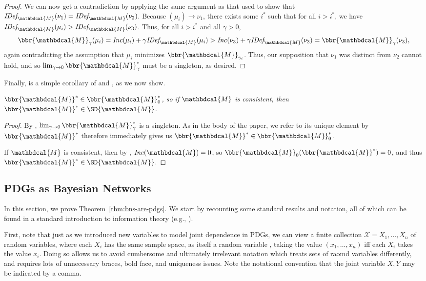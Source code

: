 \documentclass[letterpaper]{article} %
\makeatletter
\theoremstyle{plain}
\theoremstyle{definition}
\theoremstyle{remark}
\newcommand{\restate}[2]
	{\medskip\par\noindent{\bf \expandarg\Cref{thmt@@#1}.}%
 	\noindent\begingroup\em #2 \endgroup\par\smallskip}
\newcommand{\dg}[1]{\mathbdcal{#1}}
\newcommand{\IDef}[1]{\mathit{IDef}_{\!#1}}
\newcommand\Inc{\mathit{Inc}}
\makeatother
\begin{document}
\begin{proof}
We can now get a contradiction by applying the same argument as that used to show
that $\IDef{\dg M}(\nu_1) =\IDef{\dg M}(\nu_2)$.  
    Because $(\mu_{i}) \to \nu_1$, there exists some
    $i^*$ such that for all $i > i^*$, we have $\IDef{\dg M}(\mu_{i}) >
    \IDef{\dg M}(\nu_3)$. Thus, for all $i > i^*$ and all
    $\gamma > 0$, 
    \[ \bbr{\dg M}_\gamma(\mu_{i}) = \Inc(\mu_{i}) + \gamma\IDef{\dg M}(\mu_{i}) > \Inc(\nu_3) 
    + \gamma \IDef{\dg M}(\nu_3) = \bbr{\dg M}_\gamma(\nu_3),\]
again contradicting the assumption that $\mu_{i}$ minimizes
$\bbr{\dg M}_{\gamma_{i}}$.
Thus, our supposition that $\nu_1$ was distinct from $\nu_2$ cannot hold, and so
$\lim_{\gamma \to 0}\bbr{\dg M}_\gamma^*$ must be a singleton, as desired.
\end{proof}

Finally,  is a simple corollary of  and , as we now show. 
\restate{prop:consist}{
$\bbr{\dg M}^* \in \bbr{\dg M}_0^*$, so if $\dg M$ is consistent,
then $\bbr{\dg M}^* \in \SD{\dg  M}$.
}

\begin{proof}
By , $\lim_{\gamma \to 0}\bbr{\dg M}_\gamma^*$
is a singleton. As in the body of the paper, we refer to its unique element by $\bbr{\dg M}^*$
 therefore immediately gives us $\bbr{\dg M}^* \in \bbr{\dg M}_0^*$.  

If $\dg M$ is consistent, then by ,
$\Inc({\dg M}) = 0$, so $\bbr{\dg M}_0(\bbr{\dg M}^*) = 0$, and thus
$\bbr{\dg M}^* 
\in \SD{\dg M}$. 
\end{proof}


	\subsection{PDGs as Bayesian Networks}
In this section, we prove Theorem~\ref{thm:bns-are-pdgs}.  
We start by recounting some standard results and notation, all of
which can be found in a standard introduction to information
theory (e.g., \cite[Chapter 1]{mackay2003information}).  

First, note that just as we introduced new variables to model joint dependence
in PDGs, we can view a finite collection $\mathcal X=X_1, \ldots, X_n$ of random
variables, where each $X_i$ has the same sample space, as itself a random
variable%
, taking the value $(x_1, \ldots, x_n)$ iff each $X_i$ takes the value $x_i$.
Doing so allows us to avoid cumbersome and ultimately irrelevant notation which treats sets of raomd variables differently, and requires lots of unnecessary braces, bold face, and uniqueness issues. 
Note the notational convention that the joint variable $X,Y$ may be indicated by a comma.
\end{document}

